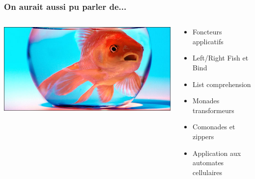 \documentclass{beamer}
\begin{document}
\begin{frame}[fragile]
  \frametitle{On aurait aussi pu parler de...}
\begin{columns}[T]
  \begin{column}{0.5\textwidth}
    \includegraphics[scale=0.3]{goldfish}
  \end{column}
  \begin{column}{0.5\textwidth}
    \begin{itemize}
      \item Foncteurs applicatifs
      \item Left/Right Fish et Bind
      \item List comprehension
      \item Monades transformeurs
      \item Comonades et zippers
      \item Application aux automates cellulaires
    \end{itemize}
  \end{column}
\end{columns}
\end{frame}
\end{document}
